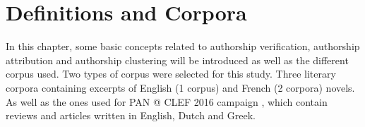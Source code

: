 \chapter{Definitions and Corpora \label{sec:definitions_and_corpora}}

In this chapter, some basic concepts related to authorship verification, authorship attribution and authorship clustering will be introduced as well as the different corpus used.
Two types of corpus were selected for this study.
Three literary corpora containing excerpts of English (1 corpus) and French (2 corpora) novels.
As well as the ones used for PAN @ CLEF 2016 campaign \cite{pan16}, which contain reviews and articles written in English, Dutch and Greek.








